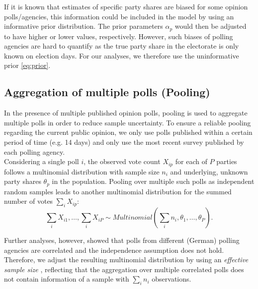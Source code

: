 \documentclass[smallcondensed]{svjour3}     %
\begin{document}
If it is known that estimates of specific party shares are biased for some opinion
polls/agencies, this information could be included in the model by using an
informative prior distribution. The prior parameters $\alpha_p$ would then
be adjusted to have higher or lower values, respectively.
However, such biases of polling agencies are hard to quantify as the true party
share in the electorate is only known on election days. For our analyses, we
therefore use the uninformative prior \eqref{eq:prior}.

\subsection{Aggregation of multiple polls (Pooling)} \label{ssec:pooling}
In the presence of multiple published opinion polls, pooling is used to
aggregate multiple polls in order to reduce sample uncertainty. To ensure a
reliable pooling regarding the current public opinion, we only use polls
published within a certain period of time (e.g. 14 days)  and only use the most recent survey published by each polling agency.\\

Considering a single poll $i$, the observed vote count $X_{ip}$ for each of
$P$ parties follows a multinomial distribution with sample size $n_i$ and underlying,
unknown party shares $\theta_p$ in the population.
Pooling over multiple such polls as independent random samples leads to another
multinomial distribution for the summed number of votes $\sum_i X_{ip}$:
\begin{equation}
\sum\limits_i X_{i1},\ldots, \sum\limits_i X_{iP}
  \sim Multinomial \left( \sum\limits_i n_i,\theta_1,\ldots,\theta_P\right).
\end{equation}

Further analyses, however, showed that polls from different (German) polling
agencies are correlated and the independence assumption does not hold. Therefore,
we adjust the resulting multinomial distribution by using an
\textit{effective sample size} \citep{hanley_2003}, reflecting that the aggregation
over multiple correlated polls does not contain information of a sample with
$\sum_i n_i$ observations.\\
\end{document}
